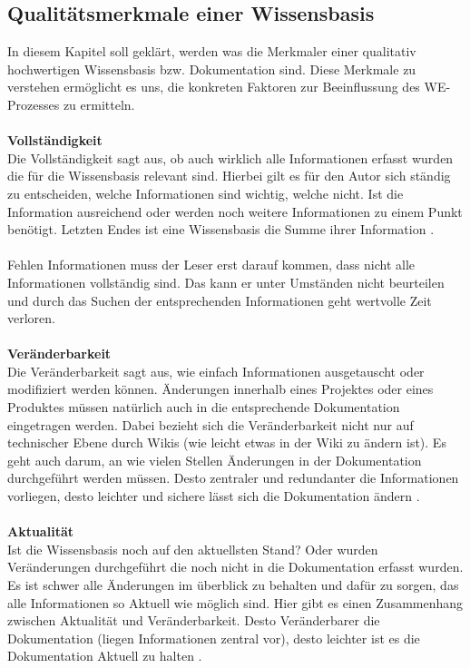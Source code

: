 \documentclass[a4paper,12pt,twoside]{scrartcl}
\begin{document}
\subsection{Qualitätsmerkmale einer Wissensbasis}
In diesem Kapitel soll geklärt, werden was die Merkmaler einer qualitativ hochwertigen Wissensbasis bzw. Dokumentation sind. Diese Merkmale zu verstehen ermöglicht es uns, die konkreten Faktoren zur Beeinflussung des WE-Prozesses zu ermitteln.
\\\\
\textbf{Vollständigkeit}\\
Die Vollständigkeit sagt aus, ob auch wirklich alle Informationen erfasst wurden die für die Wissensbasis relevant sind. Hierbei gilt es für den Autor sich ständig zu entscheiden, welche Informationen sind wichtig, welche nicht. Ist die Information ausreichend oder werden noch weitere Informationen zu einem Punkt benötigt. Letzten Endes ist eine Wissensbasis die Summe ihrer Information \cite{Prause2013}.
\\\\
Fehlen Informationen muss der Leser erst darauf kommen, dass nicht alle Informationen vollständig sind. Das kann er unter Umständen nicht beurteilen und durch das Suchen der entsprechenden Informationen geht wertvolle Zeit verloren.
\\\\
\textbf{Veränderbarkeit}\\
Die Veränderbarkeit sagt aus, wie einfach Informationen ausgetauscht oder modifiziert werden können. Änderungen innerhalb eines Projektes oder eines Produktes müssen natürlich auch in die entsprechende Dokumentation eingetragen werden. Dabei bezieht sich die Veränderbarkeit nicht nur auf technischer Ebene durch Wikis (wie leicht etwas in der Wiki zu ändern ist). Es geht auch darum, an wie vielen Stellen Änderungen in der Dokumentation durchgeführt werden müssen. Desto zentraler und redundanter die Informationen vorliegen, desto leichter und sichere lässt sich die Dokumentation ändern \cite{Prause2013}.
\\\\
\textbf{Aktualität}\\
Ist die Wissensbasis noch auf den aktuellsten Stand? Oder wurden Veränderungen durchgeführt die noch nicht in die Dokumentation erfasst wurden. Es ist schwer alle Änderungen im überblick zu behalten und dafür zu sorgen, das alle Informationen so Aktuell wie möglich sind. Hier gibt es einen Zusammenhang zwischen Aktualität und Veränderbarkeit. Desto Veränderbarer die Dokumentation (liegen Informationen zentral vor), desto leichter ist es die Dokumentation Aktuell zu halten \cite{Prause2013}.
\end{document}
